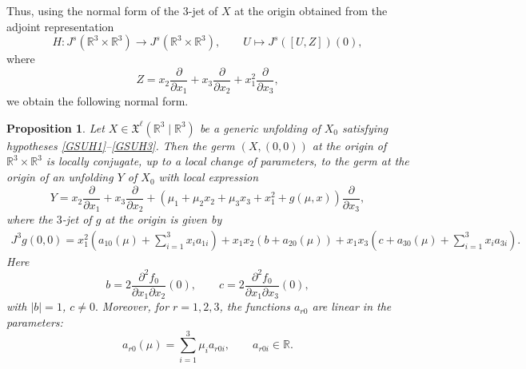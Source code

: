\documentclass[12pt]{article}
\newtheorem{proposition}{Proposition}[section]
\newtheorem{remark definition}{Remark Definition}[section]
\begin{document}
Thus, using the normal form of the $3$-jet of $X$ at the origin obtained
from the adjoint representation
$$
H: J^s(\mathbb{R}^3\times \mathbb{R}^3)
\longrightarrow
J^s(\mathbb{R}^3\times \mathbb{R}^3),
\qquad
U\longmapsto J^s([U,Z])(0),
$$
where
$$
Z
=
x_2\frac{\partial}{\partial x_1}
+
x_3\frac{\partial}{\partial x_2}
+
x_1^2\frac{\partial}{\partial x_3},
$$
we obtain the following normal form.

\begin{proposition}
	Let $X\in \mathfrak{X}^{\ell}(\mathbb{R}^3\mid \mathbb{R}^3)$
	be a generic unfolding of $X_0$ satisfying hypotheses
	\eqref{GSUH1}--\eqref{GSUH3}. Then the germ
	$(X,(0,0))$ at the origin of
	$\mathbb{R}^3\times \mathbb{R}^3$ is locally conjugate, up to a local
	change of parameters, to the germ at the origin of an unfolding $Y$ of
	$X_0$ with local expression
	\begin{equation}
		\label{GSUH4}
		\tag{H4}
		Y
		=
		x_2\frac{\partial}{\partial x_1}
		+
		x_3\frac{\partial}{\partial x_2}
		+
		\left(
		\mu_1+\mu_2x_2+\mu_3x_3+x_1^2+g(\mu,x)
		\right)
		\frac{\partial}{\partial x_3},
	\end{equation}
	where the $3$-jet of $g$ at the origin is given by
	\begin{align*}
		J^3g(0,0)
		=
		x_1^2
		\left(
		a_{10}(\mu)+\sum_{i=1}^3 x_i a_{1i}
		\right)
		+
		x_1x_2
		\left(
		b+a_{20}(\mu)
		\right) 
		+
		x_1x_3
		\left(
		c+a_{30}(\mu)+\sum_{i=1}^3 x_i a_{3i}
		\right).
	\end{align*}
	Here
	$$
	b
	=
	2\frac{\partial^2 f_0}{\partial x_1\partial x_2}(0),
	\qquad
	c
	=
	2\frac{\partial^2 f_0}{\partial x_1\partial x_3}(0),
	$$
	with
	$|b|=1$, $c\neq 0.$
	Moreover, for $r=1,2,3$, the functions $a_{r0}$ are linear in the
	parameters:
	$$
	a_{r0}(\mu)
	=
	\sum_{i=1}^3 \mu_i a_{r0i},
	\qquad
	a_{r0i}\in \mathbb{R}.
	$$
\end{proposition}
\end{document}
